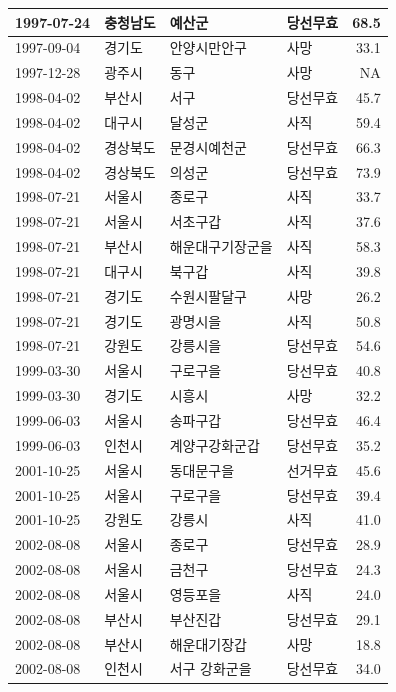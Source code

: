 \documentclass[
  11pt,
  letter]{article}
\begin{document}
\begin{longtable}[t]{l|l|l|l|r}
1997-07-24 & 충청남도 & 예산군 & 당선무효 & 68.5\\
\hline
1997-09-04 & 경기도 & 안양시만안구 & 사망 & 33.1\\
\hline
1997-12-28 & 광주시 & 동구 & 사망 & NA\\
\hline
1998-04-02 & 부산시 & 서구 & 당선무효 & 45.7\\
\hline
1998-04-02 & 대구시 & 달성군 & 사직 & 59.4\\
\hline
1998-04-02 & 경상북도 & 문경시예천군 & 당선무효 & 66.3\\
\hline
1998-04-02 & 경상북도 & 의성군 & 당선무효 & 73.9\\
\hline
1998-07-21 & 서울시 & 종로구 & 사직 & 33.7\\
\hline
1998-07-21 & 서울시 & 서초구갑 & 사직 & 37.6\\
\hline
1998-07-21 & 부산시 & 해운대구기장군을 & 사직 & 58.3\\
\hline
1998-07-21 & 대구시 & 북구갑 & 사직 & 39.8\\
\hline
1998-07-21 & 경기도 & 수원시팔달구 & 사망 & 26.2\\
\hline
1998-07-21 & 경기도 & 광명시을 & 사직 & 50.8\\
\hline
1998-07-21 & 강원도 & 강릉시을 & 당선무효 & 54.6\\
\hline
1999-03-30 & 서울시 & 구로구을 & 당선무효 & 40.8\\
\hline
1999-03-30 & 경기도 & 시흥시 & 사망 & 32.2\\
\hline
1999-06-03 & 서울시 & 송파구갑 & 당선무효 & 46.4\\
\hline
1999-06-03 & 인천시 & 계양구강화군갑 & 당선무효 & 35.2\\
\hline
2001-10-25 & 서울시 & 동대문구을 & 선거무효 & 45.6\\
\hline
2001-10-25 & 서울시 & 구로구을 & 당선무효 & 39.4\\
\hline
2001-10-25 & 강원도 & 강릉시 & 사직 & 41.0\\
\hline
2002-08-08 & 서울시 & 종로구 & 당선무효 & 28.9\\
\hline
2002-08-08 & 서울시 & 금천구 & 당선무효 & 24.3\\
\hline
2002-08-08 & 서울시 & 영등포을 & 사직 & 24.0\\
\hline
2002-08-08 & 부산시 & 부산진갑 & 당선무효 & 29.1\\
\hline
2002-08-08 & 부산시 & 해운대기장갑 & 사망 & 18.8\\
\hline
2002-08-08 & 인천시 & 서구 강화군을 & 당선무효 & 34.0\\

\end{longtable}
\end{document}
